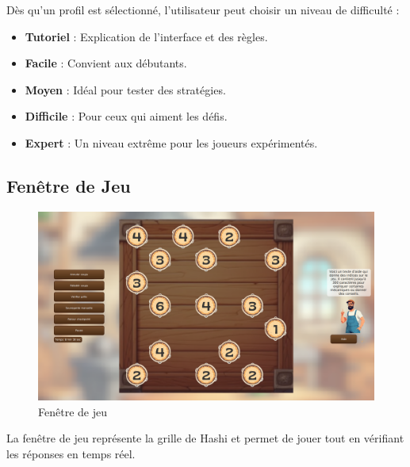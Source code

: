 Dès qu'un profil est sélectionné, l'utilisateur peut choisir un niveau de difficulté :

\begin{itemize}
    \item \textbf{Tutoriel} : Explication de l'interface et des règles.
    \item \textbf{Facile} : Convient aux débutants.
    \item \textbf{Moyen} : Idéal pour tester des stratégies.
    \item \textbf{Difficile} : Pour ceux qui aiment les défis.
    \item \textbf{Expert} : Un niveau extrême pour les joueurs expérimentés.
\end{itemize}
\newpage
\subsection{Fenêtre de Jeu}

\begin{figure}[h]
    \centering
    \includegraphics[width=15cm]{../Annexe/Screen/FenetreJeu.png}
    \caption{Fenêtre de jeu}
\end{figure}

La fenêtre de jeu représente la grille de Hashi et permet de jouer tout en vérifiant les réponses en temps réel.

